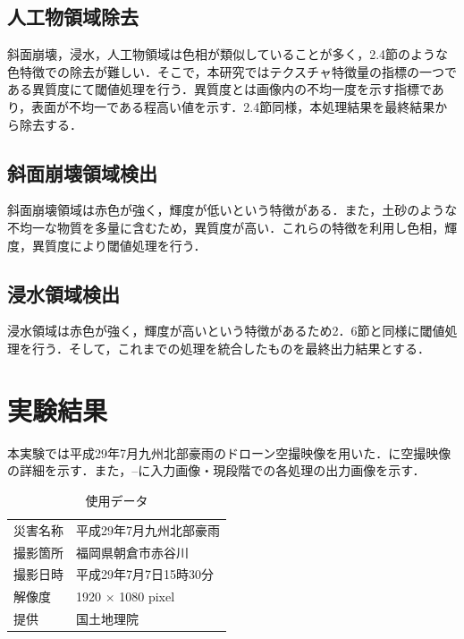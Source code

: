 \documentclass[a4paper, twocolumn, xelatex, 10pt, ja=standard, Ligatures=TeX]{bxjsarticle}
\begin{document}
		\subsection{人工物領域除去}
			斜面崩壊，浸水，人工物領域は色相が類似していることが多く，2.4節のような色特徴での除去が難しい．そこで，本研究ではテクスチャ特徴量の指標の一つである異質度にて閾値処理を行う．異質度とは画像内の不均一度を示す指標であり，表面が不均一である程高い値を示す．2.4節同様，本処理結果を最終結果から除去する．

		\subsection{斜面崩壊領域検出}
			斜面崩壊領域は赤色が強く，輝度が低いという特徴がある．また，土砂のような不均一な物質を多量に含むため，異質度が高い．これらの特徴を利用し色相，輝度，異質度により閾値処理を行う．

		\subsection{浸水領域検出}
			浸水領域は赤色が強く，輝度が高いという特徴があるため2．6節と同様に閾値処理を行う．そして，これまでの処理を統合したものを最終出力結果とする．


	\section{実験結果}
		本実験では平成29年7月九州北部豪雨のドローン空撮映像\cite{web02}を用いた．に空撮映像の詳細を示す．また，--に入力画像・現段階での各処理の出力画像を示す．

		\begin{table}[b]
			\centering
			\caption{使用データ}
			\label{tab01}
			\begin{tabular}{l l}
				\hline %
				災害名称 & 平成29年7月九州北部豪雨 \\
				撮影箇所 & 福岡県朝倉市赤谷川 \\
				撮影日時 & 平成29年7月7日15時30分 \\
				解像度 & 1920 × 1080 pixel\\
				提供 & 国土地理院 \\ \hline %
			\end{tabular}
		\end{table}
		
\end{document}
